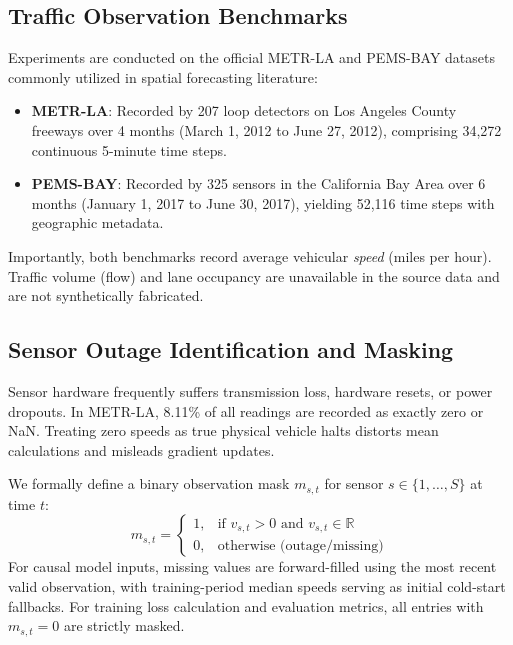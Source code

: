 \documentclass[conference]{IEEEtran}
\begin{document}
\subsection{Traffic Observation Benchmarks}
Experiments are conducted on the official METR-LA and PEMS-BAY datasets commonly utilized in spatial forecasting literature:
\begin{itemize}
    \item \textbf{METR-LA}: Recorded by 207 loop detectors on Los Angeles County freeways over 4 months (March 1, 2012 to June 27, 2012), comprising 34,272 continuous 5-minute time steps.
    \item \textbf{PEMS-BAY}: Recorded by 325 sensors in the California Bay Area over 6 months (January 1, 2017 to June 30, 2017), yielding 52,116 time steps with geographic metadata.
\end{itemize}
Importantly, both benchmarks record average vehicular \textit{speed} (miles per hour). Traffic volume (flow) and lane occupancy are unavailable in the source data and are not synthetically fabricated.

\subsection{Sensor Outage Identification and Masking}
Sensor hardware frequently suffers transmission loss, hardware resets, or power dropouts. In METR-LA, 8.11\% of all readings are recorded as exactly zero or NaN. Treating zero speeds as true physical vehicle halts distorts mean calculations and misleads gradient updates.

We formally define a binary observation mask $m_{s,t}$ for sensor $s \in \{1, \dots, S\}$ at time $t$:
\begin{equation}
m_{s,t} = \begin{cases} 
1, & \text{if } v_{s,t} > 0 \text{ and } v_{s,t} \in \mathbb{R} \\ 
0, & \text{otherwise (outage/missing)} 
\end{cases}
\end{equation}
For causal model inputs, missing values are forward-filled using the most recent valid observation, with training-period median speeds serving as initial cold-start fallbacks. For training loss calculation and evaluation metrics, all entries with $m_{s,t} = 0$ are strictly masked.
\end{document}
